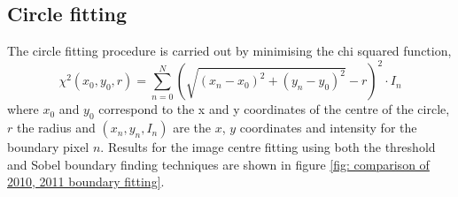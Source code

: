 
%
%
%

%
%
%




 
 
 \newpage
 
\subsection{Circle fitting}
The circle fitting procedure is carried out by minimising the chi squared function,
\begin{equation}
 \chi^2(x_0, y_0, r) = \sum \limits_{n=0}^{N}\left(\sqrt{(x_n-x_0)^2 + (y_n-y_0)^2} - r\right)^2 \cdot I_n
\end{equation}
where $x_0$ and $y_0$ correspond to the x and y coordinates of the centre of the circle, $r$ the radius and $(x_n, y_n, I_n)$ are the $x$, $y$ coordinates and intensity for the boundary pixel $n$. Results for the image centre fitting using both the threshold and Sobel boundary finding techniques are shown in figure \ref{fig: comparison of 2010, 2011 boundary fitting}.

